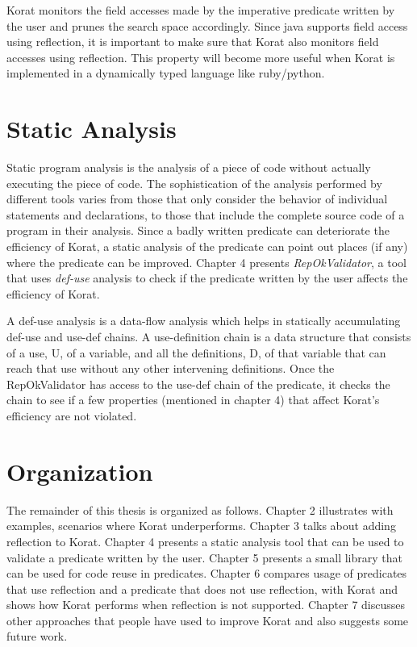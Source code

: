\para
Korat monitors the field accesses made by the imperative predicate written by the user and prunes the search space accordingly. Since java supports field access using reflection, it is important to make sure that Korat also monitors field accesses using reflection. This property will become more useful when Korat is implemented in a dynamically typed language like ruby/python. 

\section{Static Analysis}
Static program analysis is the analysis of a piece of code without actually executing the piece of code. The sophistication of the analysis performed by different tools varies from those that only consider the behavior of individual statements and declarations, to those that include the complete source code of a program in their analysis. Since a badly written predicate can deteriorate the efficiency of Korat, a static analysis of the predicate can point out places (if any) where the predicate can be improved. Chapter 4 presents \emph{RepOkValidator}, a tool that  uses \emph{def-use} analysis to check if the predicate written by the user affects the efficiency of Korat.

\para
A def-use analysis is a data-flow analysis which helps in statically accumulating def-use and use-def chains. A use-definition chain is a data structure that consists of a use, U, of a variable, and all the definitions, D, of that variable that can reach that use without any other intervening definitions. Once the RepOkValidator has access to the use-def chain of the predicate, it checks the chain to see if a few properties (mentioned in chapter 4) that affect Korat’s efficiency are not violated.

\section{Organization}
The remainder of this thesis is organized as follows. Chapter 2 illustrates with examples, scenarios where Korat underperforms. Chapter 3 talks about adding reflection to Korat. Chapter 4 presents a static analysis tool that can be used to validate a predicate written by the user. Chapter 5 presents a small library that can be used for code reuse in predicates. Chapter 6 compares usage of predicates that use reflection and a predicate that does not use reflection, with Korat and shows how Korat performs when reflection is not supported. Chapter 7 discusses other approaches that people have used to improve Korat and also suggests some future work.
